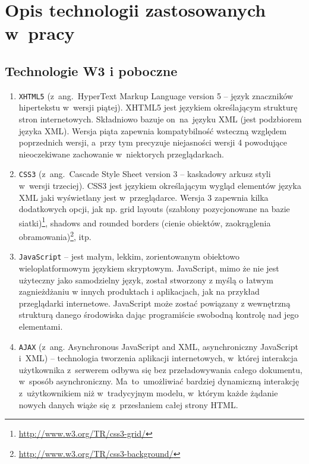 \section{Opis technologii zastosowanych w~pracy}

\subsection{Technologie W3 i poboczne}

\begin{enumerate}
  \item \texttt{XHTML5}\cite{html5doc} (z~ang.~HyperText Markup Language version 5 -- język znaczników hipertekstu w~wersji piątej). XHTML5 jest językiem określającym strukturę stron internetowych. Składniowo bazuje on~na~języku XML (jest podzbiorem języka XML). Wersja piąta zapewnia kompatybilność wsteczną względem poprzednich wersji, a~przy tym precyzuje niejasności wersji 4 powodujące nieoczekiwane zachowanie w~niektorych przeglądarkach.
  \item \texttt{CSS3}\cite{css3doc} (z~ang.~Cascade Style Sheet version 3 -- kaskadowy arkusz styli w~wersji trzeciej). CSS3 jest językiem określającym wygląd elementów języka XML jaki wyświetlany jest w~przeglądarce. Wersja 3 zapewnia kilka dodatkowych opcji, jak np. grid layouts (szablony pozycjonowane na bazie siatki)\footnote{\url{http://www.w3.org/TR/css3-grid/}}, shadows and rounded borders (cienie obiektów, zaokrąglenia obramowania)\footnote{\url{http://www.w3.org/TR/css3-background/}}, itp.
  \item \texttt{JavaScript} -- jest małym, lekkim, zorientowanym obiektowo wieloplatformowym językiem skryptowym. JavaScript, mimo że nie jest użyteczny jako samodzielny język, został stworzony z myślą o łatwym zagnieżdżaniu w innych produktach i aplikacjach, jak na przykład przeglądarki internetowe. JavaScript może zostać powiązany z wewnętrzną strukturą danego środowiska dając programiście swobodną kontrolę nad jego elementami.

  \item \texttt{AJAX} (z~ang. Asynchronous JavaScript and XML, asynchroniczny JavaScript i~XML) -- technologia tworzenia aplikacji internetowych, w~której interakcja użytkownika z~serwerem odbywa się bez przeładowywania całego dokumentu, w~sposób asynchroniczny. Ma~to~umożliwiać bardziej dynamiczną interakcję z~użytkownikiem niż w~tradycyjnym modelu, w~którym każde żądanie nowych danych wiąże się z~przesłaniem całej strony HTML.


\end{enumerate}
